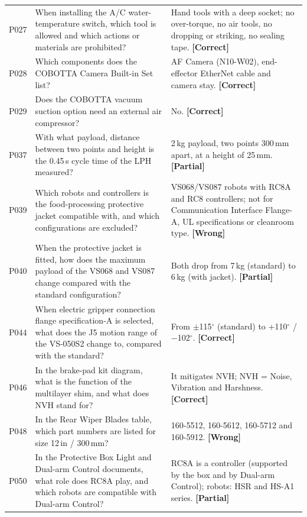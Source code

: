 \documentclass[runningheads]{llncs}
\begin{document}
\begin{table}[p]
\begin{tabular}{@{}lp{}p{}@{}}
P027 & When installing the A/C water-temperature switch, which tool is allowed and which actions or materials are prohibited? & Hand tools with a deep socket; no over-torque, no air tools, no dropping or striking, no sealing tape. \textbf{[Correct]} \\
P028 & Which components does the COBOTTA Camera Built-in Set list? & AF Camera (N10-W02), end-effector EtherNet cable and camera stay. \textbf{[Correct]} \\
P029 & Does the COBOTTA vacuum suction option need an external air compressor? & No. \textbf{[Correct]} \\
P037 & With what payload, distance between two points and height is the 0.45\,s cycle time of the LPH measured? & 2\,kg payload, two points 300\,mm apart, at a height of 25\,mm. \textbf{[Partial]} \\
P039 & Which robots and controllers is the food-processing protective jacket compatible with, and which configurations are excluded? & VS068/VS087 robots with RC8A and RC8 controllers; not for Communication Interface Flange-A, UL specifications or cleanroom type. \textbf{[Wrong]} \\
P040 & When the protective jacket is fitted, how does the maximum payload of the VS068 and VS087 change compared with the standard configuration? & Both drop from 7\,kg (standard) to 6\,kg (with jacket). \textbf{[Partial]} \\
P044 & When electric gripper connection flange specification-A is selected, what does the J5 motion range of the VS-050S2 change to, compared with the standard? & From $\pm$115$^\circ$ (standard) to +110$^\circ$ / $-$102$^\circ$. \textbf{[Correct]} \\
P046 & In the brake-pad kit diagram, what is the function of the multilayer shim, and what does NVH stand for? & It mitigates NVH; NVH = Noise, Vibration and Harshness. \textbf{[Correct]} \\
P048 & In the Rear Wiper Blades table, which part numbers are listed for size 12\,in / 300\,mm? & 160-5512, 160-5612, 160-5712 and 160-5912. \textbf{[Wrong]} \\
P050 & In the Protective Box Light and Dual-arm Control documents, what role does RC8A play, and which robots are compatible with Dual-arm Control? & RC8A is a controller (supported by the box and by Dual-arm Control); robots: HSR and HS-A1 series. \textbf{[Partial]} \\
\bottomrule
\end{tabular}
\end{table}
\end{document}

